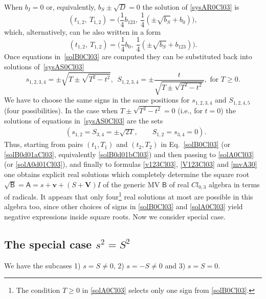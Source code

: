 \documentclass{birkjour}
\newcommand{\cl}[2]{\ensuremath{\mathit{Cl}_{#1,#2}}}
\def\A{\mathsf{A}}
\def\B{\mathsf{B}}
\newcommand{\bv}{\ensuremath{\mathbf{v}}}
\newcommand{\bV}{\ensuremath{\mathbf{V}}}
\begin{document}
When  $b_{I}=0$ or, equivalently, $b_{S}\pm\sqrt{D} = 0$ the
solution of \eqref{sysAR0Cl03} is
\begin{equation}\label{solB0d01aCl03}
  (t_{1,2},\ T_{1,2})= \bigl(\frac{1}{4}b_{123},\ \frac{1}{4} (\pm\sqrt{b_{S}}+b_{0})\bigr),
\end{equation}
which, alternatively, can be also written in a form
\begin{equation}\label{solB0d01bCl03}
  (t_{1,2},\ T_{1,2})= \bigl(\frac{1}{4}b_0,\ \frac{1}{4} (\pm\sqrt{b_{S}}+b_{123})\bigr).
\end{equation}
Once equations in~\eqref{solB0Cl03} are computed they can be
substituted back into solutions of~\eqref{sysAS0Cl03}
\begin{equation}\label{solA0Cl03}
s_{1,2,3,4} =\pm\sqrt{T\pm\sqrt{T^2- t^2}},\;\, S_{1,2,3,4}
  =\pm\frac{t}{\sqrt{T\pm\sqrt{T^2- t^2}}}, \textrm{ for }T\ge 0.
\end{equation}
We have to choose the same signs in the same positions for $s_{1,2,3,4}$
and $S_{1,2,4,5}$ (four possibilities). In the case when
$T\pm\sqrt{T^2- t^2}=0$ (i.e., for $t=0$) the solutions of
equations in~\eqref{sysAS0Cl03} are the sets
\begin{equation}\label{solA0d01Cl03}
\begin{split}
& (s_{1,2}= S_{3,4} = \pm\sqrt{2T}, \qquad S_{1,2}= s_{3,4}  = 0).
\end{split}\end{equation}
Thus, starting  from pairs $(t_1,T_1)$ and $(t_2,T_2)$ in
Eq.~\eqref{solB0Cl03} (or \eqref{solB0d01aCl03}, equivalently
\eqref{solB0d01bCl03}) and then passing to \eqref{solA0Cl03} (or
\eqref{solA0d01Cl03}), and finally to formulas \eqref{v123Cl03},
\eqref{V123Cl03} and \eqref{mvA30} one obtains explicit real
solutions which completely determine the square root
$\sqrt{\B}=\A=s+\bv+(S+\bV)I$ of the generic MV $\B$ of real
$\cl{0}{3}$ algebra in terms of radicals. It appears that only
four\footnote{The condition $T\ge 0$ in \eqref{solA0Cl03} selects
only one sign from \eqref{solB0Cl03}.} real solutions at most are
possible in this algebra too, since other choices of signs in
\eqref{solB0Cl03} and \eqref{solA0Cl03} yield negative expressions
inside square roots. Now we consider special case.

\subsection{The special case $s^2 = S^2$}

We have the subcases  1) $s = S\neq 0$,  2)  $s = -S\neq 0$ and 3) $s=S=0$.
\end{document}
